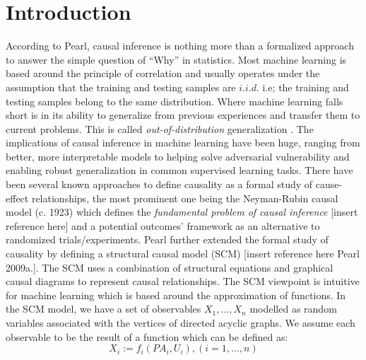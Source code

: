 \documentclass{article}
\begin{document}
\section{Introduction}
\label{introduction}
\iffalse
According to Pearl, causal inference is nothing more than a formalized approach to answer the simple question of “Why” in statistics. Most machine learning is based around the principle of correlation and usually operates under the assumption that the training and testing samples are $i.i.d$. i.e; the training and testing samples belong to the same distribution. Where machine learning falls short is in its ability to generalize from previous experiences and transfer them to current problems. This is called \textit{out-of-distribution} generalization \cite{Schoelkopf2019}. The implications of causal inference in machine learning have been huge, ranging from better, more interpretable models to helping solve adversarial vulnerability and enabling robust generalization in common supervised learning tasks.
There have been several known approaches to define causality as a formal study of cause-effect relationships, the most prominent one being the Neyman-Rubin causal model (c. 1923) which defines the \textit{fundamental problem of causal inference} [insert reference here] and a potential outcomes' framework as an alternative to randomized trials/experiments. Pearl further extended the formal study of causality by defining a structural causal model (SCM) [insert reference here Pearl 2009a.]. The SCM uses a combination of structural equations and graphical causal diagrams to represent causal relationships. The SCM viewpoint is intuitive for machine learning which is based around the approximation of functions. In the SCM model, we have a set of observables $X_1,...,X_n$ modelled as random variables associated with the vertices of directed acyclic graphs. We assume each observable to be the result of a function which can be defined as:
\begin{equation}
\label{scm}
    X_i := f_i(PA_i,U_i), (i=1,...,n)
\end{equation}
\end{document}
